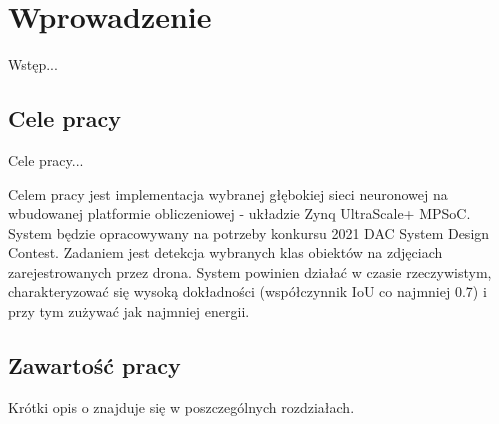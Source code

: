 \chapter{Wprowadzenie}
\label{cha:wprowadzenie}

Wstęp...

\section{Cele pracy}
\label{sec:celePracy}
Cele pracy...


Celem pracy jest implementacja wybranej głębokiej sieci neuronowej na wbudowanej platformie obliczeniowej - układzie Zynq UltraScale+ MPSoC. System będzie opracowywany na potrzeby konkursu 2021 DAC System Design Contest. Zadaniem jest detekcja wybranych klas obiektów na zdjęciach zarejestrowanych przez drona. System powinien działać w czasie rzeczywistym, charakteryzować się wysoką dokładności (współczynnik IoU co najmniej 0.7) i przy tym zużywać jak najmniej energii.






\section{Zawartość pracy}
\label{sec:zawartoscPracy}

Krótki opis o znajduje się w poszczególnych rozdziałach.

